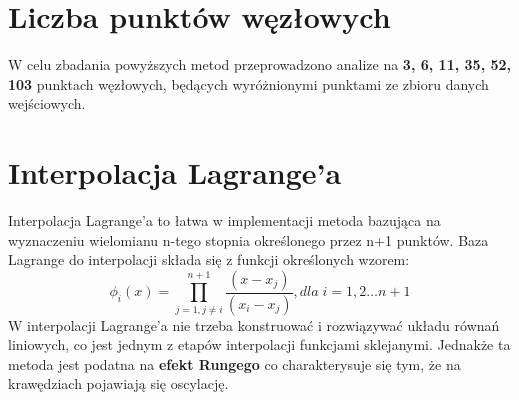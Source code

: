 \documentclass[12pt]{extarticle}
\begin{document}
\section*{Liczba punktów węzłowych}
W celu zbadania powyższych metod przeprowadzono analize na \textbf{3, 6, 11, 35, 52, 103} punktach węzłowych, będących wyróżnionymi punktami ze zbioru danych wejściowych. 

\section*{Interpolacja Lagrange'a}
Interpolacja Lagrange'a to łatwa w implementacji metoda bazująca na wyznaczeniu wielomianu n-tego stopnia określonego przez n+1 punktów. Baza Lagrange do interpolacji składa się z funkcji określonych wzorem:
\begin{equation}
    \phi_{i}(x) = \prod_{j=1, j \neq i}^{n+1}\frac{(x - x_{j})}{(x_{i} - x_{j})}, dla\;i = 1,2 \ldots n+1
\end{equation} 
W interpolacji Lagrange'a nie trzeba konstruować i rozwiązywać układu równań liniowych, co jest jednym z etapów interpolacji funkcjami sklejanymi. Jednakże ta metoda jest podatna na \textbf{efekt Rungego} co charakterysuje się tym, że na krawędziach pojawiają się oscylację.
\end{document}
